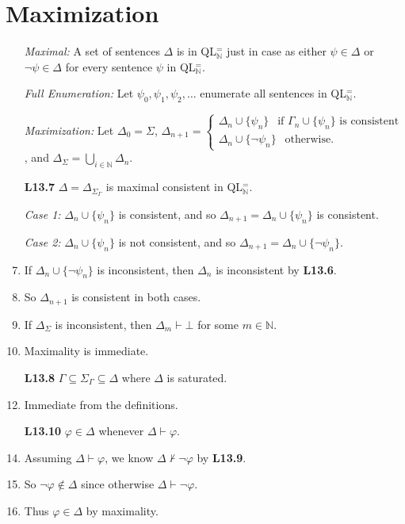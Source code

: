 \documentclass[a4paper, 11pt]{article} %
\def\proves{\ensuremath{\vdash}}
\def\nproves{\ensuremath{\nvdash}}
\newcommand{\set}[1]{\lbrace#1\rbrace} %
\newcommand{\N}{\mathbb{N}}
\def\metaA{\ensuremath{\varphi}}
\def\metaB{\ensuremath{\psi}}
\begin{document}
\section*{Maximization}

\begin{enumerate}
  \item[\it Maximal:] A set of sentences $\Delta$ is  in QL$^=_{\N}$ just in case as either $\metaB\in\Delta$ or $\neg\metaB\in\Delta$ for every sentence $\metaB$ in QL$^=_{\N}$.
  \item[\it Full Enumeration:] Let $\metaB_0,\metaB_1,\metaB_2,\ldots$ enumerate all sentences in QL$^=_{\N}$.
  \item[\it Maximization:] Let $\Delta_0 = \Sigma$, 
    $\Delta_{n+1} =
      \begin{cases}
        \Delta_n\cup\set{\metaB_n} ~~\text{ if } \Gamma_n\cup\set{\metaB_n} \text{ is consistent}\\
        \Delta_n\cup\set{\neg\metaB_n} ~~\text{ otherwise}.
      \end{cases}$,
    and $\Delta_\Sigma = \bigcup_{i\in\N}\Delta_n$. 
  \item[\bf L13.7] $\Delta=\Delta_{\Sigma_\Gamma}$ is maximal consistent in QL$^=_{\N}$.
  \item[\it Case 1:] $\Delta_n\cup\set{\metaB_n}$ is consistent, and so $\Delta_{n+1}=\Delta_n\cup\set{\metaB_n}$ is consistent. 
  \item[\it Case 2:] $\Delta_n\cup\set{\metaB_n}$ is not consistent, and so $\Delta_{n+1}=\Delta_n\cup\set{\neg\metaB_n}$.
  \item If $\Delta_n\cup\set{\neg\metaB_n}$ is inconsistent, then $\Delta_n$ is inconsistent by \textbf{L13.6}. 
  \item So $\Delta_{n+1}$ is consistent in both cases. 
  \item If $\Delta_\Sigma$ is inconsistent, then $\Delta_m\proves\bot$ for some $m\in\N$.
  \item Maximality is immediate.
  \item[\bf L13.8] $\Gamma\subseteq\Sigma_\Gamma\subseteq\Delta$ where $\Delta$ is saturated.
    \setcounter{enumi}{0}
  \item Immediate from the definitions.
  \item[\bf L13.10] $\metaA\in\Delta$ whenever $\Delta\proves\metaA$.
    \setcounter{enumi}{0}
  \item Assuming $\Delta\proves\metaA$, we know $\Delta\nproves\neg\metaA$ by \textbf{L13.9}.
  \item So $\neg\metaA\notin\Delta$ since otherwise $\Delta\proves\neg\metaA$.
  \item Thus $\metaA\in\Delta$ by maximality. 
\end{enumerate}
\end{document}
